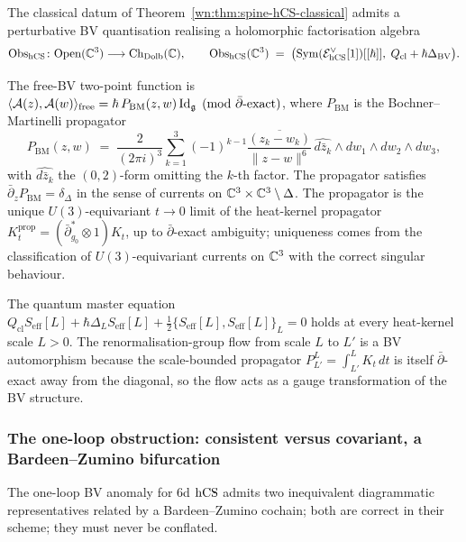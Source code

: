 \begin{theorem}
\label{wn:thm:spine-hCS-quantum}
The classical datum of Theorem~\ref{wn:thm:spine-hCS-classical} admits
a perturbative BV quantisation realising a holomorphic factorisation
algebra
\[
\mathrm{Obs}_{\mathrm{hCS}} \colon \mathrm{Open}(\mathbb{C}^3) \longrightarrow
\mathrm{Ch}_{\mathrm{Dolb}}(\mathbb{C}),\qquad
\mathrm{Obs}_{\mathrm{hCS}}(\mathbb{C}^3) \;=\; \bigl(\mathrm{Sym}(\mathcal{E}_{\mathrm{hCS}}^{\vee}[1])[[\hbar]],\;
Q_{\mathrm{cl}} + \hbar\Delta_{\mathrm{BV}}\bigr).
\]

The free-BV two-point function is
$\langle \mathcal{A}(z), \mathcal{A}(w)\rangle_{\mathrm{free}} =
\hbar\, P_{\mathrm{BM}}(z, w)\,\mathrm{Id}_{\mathfrak{g}} \pmod{\bar\partial\text{-exact}}$,
where $P_{\mathrm{BM}}$ is the Bochner--Martinelli propagator
\[
P_{\mathrm{BM}}(z, w) \;=\; \frac{2}{(2\pi i)^3}
\sum_{k=1}^{3} (-1)^{k-1} \frac{\overline{(z_k - w_k)}}{\|z - w\|^{6}}
\,\widehat{d\bar z_k} \wedge dw_1 \wedge dw_2 \wedge dw_3,
\]
with $\widehat{d\bar z_k}$ the $(0,2)$-form omitting the $k$-th factor.
The propagator satisfies $\bar\partial_z P_{\mathrm{BM}} = \delta_\Delta$
in the sense of currents on $\mathbb{C}^3 \times \mathbb{C}^3 \setminus \Delta$. The
propagator is the unique $U(3)$-equivariant $t \to 0$ limit of the
heat-kernel propagator $K^{\mathrm{prop}}_t = (\bar\partial^*_{g_0}
\otimes 1) K_t$, up to $\bar\partial$-exact ambiguity; uniqueness comes
from the classification of $U(3)$-equivariant currents on $\mathbb{C}^3$ with
the correct singular behaviour.

The quantum master equation
$Q_{\mathrm{cl}} S_{\mathrm{eff}}[L] + \hbar\Delta_L S_{\mathrm{eff}}[L]
+ \tfrac{1}{2}\{S_{\mathrm{eff}}[L], S_{\mathrm{eff}}[L]\}_L = 0$
holds at every heat-kernel scale $L > 0$. The renormalisation-group
flow from scale $L$ to $L'$ is a BV automorphism because the
scale-bounded propagator $P_{L'}^L = \int_{L'}^L K_t\, dt$ is itself
$\bar\partial$-exact away from the diagonal, so the flow acts as a
gauge transformation of the BV structure.
\end{theorem}

\subsubsection{The one-loop obstruction: consistent versus covariant,
a Bardeen--Zumino bifurcation}

The one-loop BV anomaly for $6$d $\mathrm{hCS}$ admits two inequivalent
diagrammatic representatives related by a Bardeen--Zumino cochain; both
are correct in their scheme; they must never be conflated.

